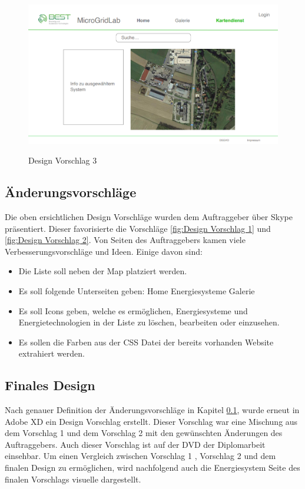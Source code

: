 \begin{figure}[h]
	\centering
	\includegraphics[height=7cm,width=12cm]{images/DesignVorschlag3}
	\caption{Design Vorschlag 3}
	\label{fig:Design Vorschlag 3}
\end{figure}
\subsection{Änderungsvorschläge} \label{sec:Änderungsvorschläge}
Die oben ersichtlichen Design Vorschläge wurden dem Auftraggeber über Skype präsentiert. Dieser favorisierte die Vorschläge \ref{fig:Design Vorschlag 1} und  \ref{fig:Design Vorschlag 2}. 
Von Seiten des Auftraggebers kamen viele Verbesserungsvorschläge und Ideen. Einige davon sind:
\begin{itemize}
	\item Die Liste soll neben der Map platziert werden.
	\item Es soll folgende Unterseiten geben:
	\subitem Home
	\subitem Energiesysteme
	\subitem Galerie
	\item Es soll Icons geben, welche es ermöglichen, Energiesysteme und Energietechnologien in der Liste zu löschen, bearbeiten oder einzusehen. 
	\item Es sollen die Farben aus der CSS Datei der bereits vorhanden Website extrahiert werden.
	
\end{itemize}


\subsection{Finales Design}
Nach genauer Definition der Änderungsvorschläge in Kapitel \ref{sec:Änderungsvorschläge}, wurde erneut in Adobe XD ein Design Vorschlag erstellt. Dieser Vorschlag war eine Mischung aus dem Vorschlag 1 und dem Vorschlag 2 mit den gewünschten Änderungen des Auftraggebers. Auch dieser Vorschlag ist auf der DVD der Diplomarbeit einsehbar. Um einen Vergleich zwischen Vorschlag 1 , Vorschlag 2 und dem finalen Design zu ermöglichen, wird nachfolgend auch die Energiesystem Seite des finalen Vorschlags visuelle dargestellt.

